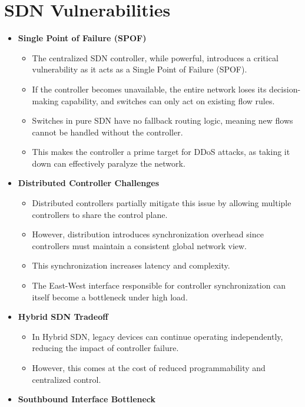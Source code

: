 \documentclass[12pt,a4paper]{article}
\begin{document}
\section{SDN Vulnerabilities}
\begin{itemize}
  \item \textbf{Single Point of Failure (SPOF)}
  \begin{itemize}
    \item The centralized SDN controller, while powerful, introduces a critical
    vulnerability as it acts as a Single Point of Failure (SPOF).
    \item If the controller becomes unavailable, the entire network loses its
    decision-making capability, and switches can only act on existing flow rules.
    \item Switches in pure SDN have no fallback routing logic, meaning new flows
    cannot be handled without the controller.
    \item This makes the controller a prime target for DDoS attacks, as taking it
    down can effectively paralyze the network.
  \end{itemize}
  \item \textbf{Distributed Controller Challenges}
  \begin{itemize}
    \item Distributed controllers partially mitigate this issue by allowing
    multiple controllers to share the control plane.
    \item However, distribution introduces synchronization overhead since
    controllers must maintain a consistent global network view.
    \item This synchronization increases latency and complexity.
    \item The East-West interface responsible for controller synchronization can
    itself become a bottleneck under high load.
  \end{itemize}
  \item \textbf{Hybrid SDN Tradeoff}
  \begin{itemize}
    \item In Hybrid SDN, legacy devices can continue operating independently,
    reducing the impact of controller failure.
    \item However, this comes at the cost of reduced programmability and
    centralized control.
  \end{itemize}
  \item \textbf{Southbound Interface Bottleneck}

\end{itemize}
\end{document}
